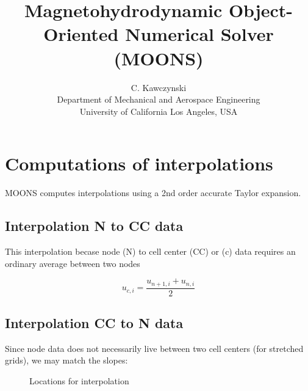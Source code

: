 \documentclass[11pt]{article}
\newcommand{\height}{0.4}
\newcommand{\radius}{0.1}
\newcommand{\offSet}{12}
\newcommand{\Deltah}{3}
\begin{document}
\doublespacing
\title{Magnetohydrodynamic Object-Oriented Numerical Solver (MOONS)}
\author{C. Kawczynski \\
Department of Mechanical and Aerospace Engineering \\
University of California Los Angeles, USA\\
}
\maketitle

\section{Computations of interpolations}
MOONS computes interpolations using a 2nd order accurate Taylor expansion.

\subsection{Interpolation N to CC data}
This interpolation becase node (N) to cell center (CC) or (c) data requires an ordinary average between two nodes

\begin{equation}
	u_{c,i} = \frac{u_{n+1,i}+u_{n,i}}{2}
\end{equation}

\subsection{Interpolation CC to N data}
Since node data does not necessarily live between two cell centers (for stretched grids), we may match the slopes:

\begin{figure}[h!]
  \begin{center}
    \caption{Locations for interpolation}
  \end{center}
\end{figure}
\end{document}
